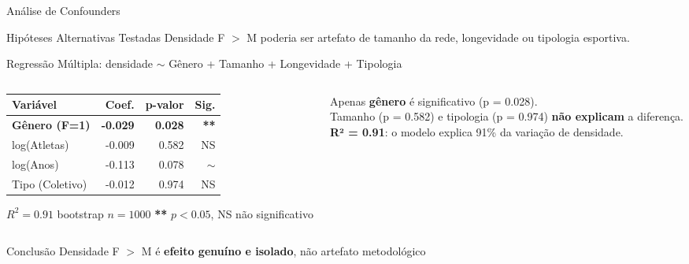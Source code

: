 \begin{frame}{Análise de Confounders}
    \begin{block}{Hipóteses Alternativas Testadas}
        \footnotesize
        Densidade F $>$ M poderia ser artefato de tamanho da rede, longevidade ou tipologia esportiva.
    \end{block}

    \vspace{0.2cm}

    \begin{block}{Regressão Múltipla: densidade $\sim$ Gênero + Tamanho + Longevidade + Tipologia}
        \begin{columns}[T]
            \begin{column}{0.54\textwidth}
                \centering
                \scriptsize
                \vspace{0.1cm}
                \begin{tabular}{lrrr}
                \toprule
                \textbf{Variável} & \textbf{Coef.} & \textbf{p-valor} & \textbf{Sig.} \\
                \midrule
                \textbf{Gênero (F=1)} & \textbf{-0.029} & \textbf{0.028} & \textbf{**} \\
                log(Atletas)          &  -0.009         &  0.582          & NS            \\
                log(Anos)             &  -0.113         &  0.078          & $\sim$        \\
                Tipo (Coletivo)       &  -0.012         &  0.974          & NS            \\
                \bottomrule
                \end{tabular}
                \vspace{0.05cm}
                \tiny $R^2 = 0.91$ \quad bootstrap $n=1000$ \quad \textbf{**} $p<0.05$, NS não significativo
            \end{column}
            \begin{column}{0.42\textwidth}
                \footnotesize
                \vspace{0.2cm}
                Apenas \textbf{gênero} é significativo (p = 0.028).\\[0.2cm]
                Tamanho (p = 0.582) e tipologia (p = 0.974) \textbf{não explicam} a diferença.\\[0.2cm]
                \textbf{R² = 0.91}: o modelo explica 91\% da variação de densidade.
            \end{column}
        \end{columns}
    \end{block}

    \vspace{0.2cm}

    \begin{alertblock}{Conclusão}
        \footnotesize\centering
        Densidade F $>$ M é \textbf{efeito genuíno e isolado}, não artefato metodológico
    \end{alertblock}
\end{frame}

